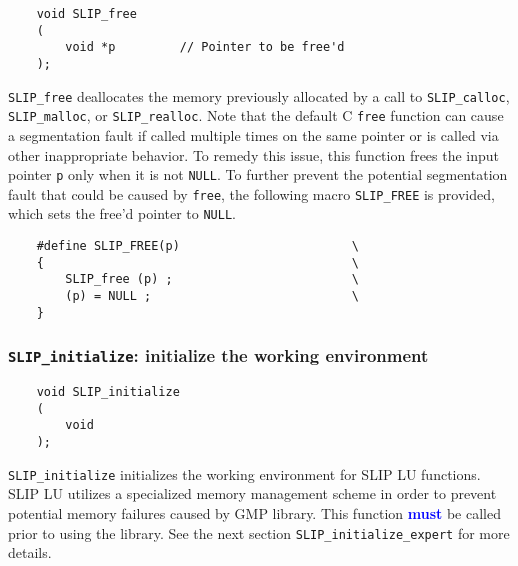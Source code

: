 \documentclass[11pt]{article}
\theoremstyle{definition}
\begin{document}
\begin{mdframed}[userdefinedwidth=6in]
{\footnotesize
\begin{verbatim}
    void SLIP_free
    (
        void *p         // Pointer to be free'd
    );
\end{verbatim}
} \end{mdframed}

\verb|SLIP_free| deallocates the memory previously allocated by a call to
\verb|SLIP_calloc|, \verb|SLIP_malloc|, or \verb|SLIP_realloc|. Note that the
default C \verb|free| function can cause a segmentation fault if called
multiple times on the same pointer or is called via other inappropriate
behavior. To remedy this issue, this function frees the input pointer \verb|p|
only when it is not \verb|NULL|. To further prevent the potential segmentation
fault that could be caused by \verb|free|, the following macro \verb|SLIP_FREE|
is provided, which sets the free'd pointer to \verb|NULL|.

\begin{mdframed}[userdefinedwidth=6in]
{\footnotesize
\begin{verbatim}
    #define SLIP_FREE(p)                        \
    {                                           \
        SLIP_free (p) ;                         \
        (p) = NULL ;                            \
    }
\end{verbatim}
} \end{mdframed}

\cprotect\subsubsection{\verb|SLIP_initialize|: initialize the working environment}

\begin{mdframed}[userdefinedwidth=6in]
{\footnotesize
\begin{verbatim}
    void SLIP_initialize
    (
        void
    );
\end{verbatim}
} \end{mdframed}

\verb|SLIP_initialize| initializes the working environment for SLIP LU
functions. SLIP LU utilizes a specialized memory management scheme in order to
prevent potential memory failures caused by GMP library. This function
\textcolor{blue}{\textbf{must}} be called prior to using the library. See the
next section \verb|SLIP_initialize_expert| for more details.
\end{document}
